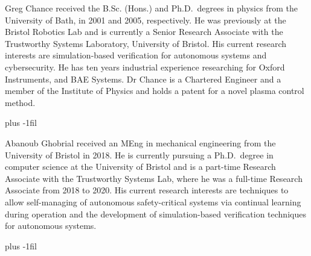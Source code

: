 \documentclass[letterpaper, 10 pt, journal, twoside]{IEEEtran}
\begin{document}
\begin{IEEEbiography}{Greg Chance}
received the B.Sc. (Hons.) and Ph.D.\ degrees in physics from the University of Bath, in 2001 and 2005, respectively. He was previously at the Bristol Robotics Lab and is currently a Senior Research Associate with the Trustworthy Systems Laboratory, University of Bristol. His current research interests are simulation-based verification for autonomous systems and cybersecurity. He has ten years industrial experience researching for Oxford Instruments, and BAE Systems. Dr Chance is a Chartered Engineer and a member of the Institute of Physics and holds a patent for a novel plasma control method. 
\end{IEEEbiography}
\baselineskip plus -1fil  
\begin{IEEEbiography}{Abanoub Ghobrial}
received an MEng in mechanical engineering from the University of Bristol in 2018. He is currently pursuing a Ph.D.\ degree in computer science at the University of Bristol and is a part-time Research Associate with the Trustworthy Systems Lab, where he was a full-time Research Associate from 2018 to 2020. His current research interests are techniques to allow self-managing of autonomous safety-critical systems via continual learning during operation and the development of simulation-based verification techniques for autonomous systems.
\end{IEEEbiography}

\baselineskip plus -1fil  
\end{document}

